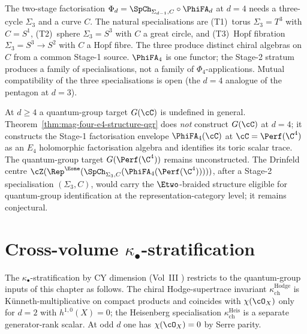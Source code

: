 \begin{remark}[Three Stage-2 specialisations at \texorpdfstring{$d = 4$}{d=4}]
\label{rem:spch-d4}
The two-stage factorisation
$\Phi_d = \SpCh_{\Sigma_{d-1}, C} \circ \PhiFA_d$ at $d = 4$ needs a
three-cycle $\Sigma_3$ and a curve $C$. The natural specialisations are
(T1)~torus $\Sigma_3 = T^3$ with $C = S^1$, (T2)~sphere $\Sigma_3 = S^3$
with $C$ a great circle, and (T3)~Hopf fibration
$\Sigma_3 = S^3 \to S^2$ with $C$ a Hopf fibre. The three produce
distinct chiral algebras on $C$ from a common Stage-1 source.
$\PhiFA_4$ is one functor; the Stage-2 stratum produces a
family of specialisations, not a family of $\Phi_4$-applications.
Mutual compatibility of the three specialisations is open (the
$d = 4$ analogue of the pentagon at $d = 3$).
\end{remark}

\begin{remark}[No quantum-group target at \texorpdfstring{$d = 4$}{d=4}]
\label{rem:upgrade-relative-cy-c-vii}
At $d \geq 4$ a quantum-group target $G(\cC)$ is undefined in general.
Theorem~\ref{thm:mag-four-e4-structure-qgr} does \emph{not} construct
$G(\cC)$ at $d = 4$; it constructs the Stage-1 factorisation envelope
$\PhiFA_4(\cC)$ at $\cC = \Perf(\C^4)$ as an $E_4$ holomorphic
factorisation algebra and identifies its toric scalar trace. The
quantum-group target $G(\Perf(\C^4))$ remains unconstructed. The
Drinfeld centre
$\cZ(\Rep^{\Eone}(\SpCh_{\Sigma_3,C}(\PhiFA_4(\Perf(\C^4)))))$, after
a Stage-2 specialisation $(\Sigma_3,C)$, would carry the
$\Etwo$-braided structure eligible for quantum-group identification
at the representation-category level; it remains conjectural.
\end{remark}


\section{Cross-volume \texorpdfstring{$\kappa_\bullet$}{kappa-.}-stratification}
\label{sec:cross-volume-kappa-strat}

The $\kappa_\bullet$-stratification by CY dimension (Vol~III
\cite{VolI}) restricts to the
quantum-group inputs of this chapter as follows. The chiral
Hodge-supertrace invariant $\kappa_{\mathrm{ch}}^{\mathrm{Hodge}}$
is K\"unneth-multiplicative on compact products and coincides with
$\chi(\cO_X)$ only for $d = 2$ with $h^{1,0}(X) = 0$; the
Heisenberg specialisation $\kappa_{\mathrm{ch}}^{\mathrm{Heis}}$ is
a separate generator-rank scalar. At odd $d$ one has
$\chi(\cO_X)=0$ by Serre parity.

